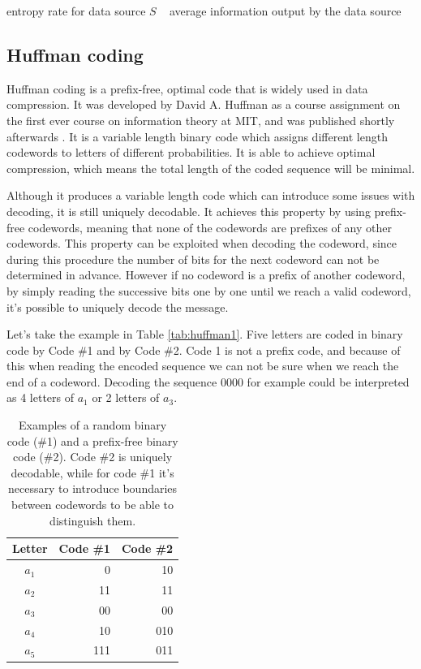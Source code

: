 entropy rate for data source $S$ ~ average information output by the data source

\subsection{Huffman coding}
Huffman coding is a prefix-free, optimal code that is widely used in data compression. It was developed by David A. Huffman as a course assignment on the first ever course on information theory at MIT, and was published shortly afterwards \cite{huffman_method_1952}. It is a variable length binary code which assigns different length codewords to letters of different probabilities. It is able to achieve optimal compression, which means the total length of the coded sequence will be minimal.

Although it produces a variable length code which can introduce some issues with decoding, it is still uniquely decodable. It achieves this property by using prefix-free codewords, meaning that none of the codewords are prefixes of any other codewords. This property can be exploited when decoding the codeword, since during this procedure the number of bits for the next codeword can not be determined in advance. However if no codeword is a prefix of another codeword, by simply reading the successive bits one by one until we reach a valid codeword, it's possible to uniquely decode the message.

Let's take the example in Table \ref{tab:huffman1}. Five letters are coded in binary code by Code \#1 and by Code \#2. Code 1 is not a prefix code, and because of this when reading the encoded sequence we can not be sure when we reach the end of a codeword. Decoding the sequence 0000 for example could be interpreted as 4 letters of $a_1$ or 2 letters of $a_3$.

\begin{table}
\caption{Examples of a random binary code (\#1) and a prefix-free binary code (\#2). Code \#2 is uniquely decodable, while for code \#1 it's necessary to introduce boundaries between codewords to be able to distinguish them.}
\centering
\begin{tabular}{crr}
\toprule
Letter & Code \#1 & Code \#2 \\
\midrule
$a_1$ & 0	& 10 \\
$a_2$ & 11	& 11 \\
$a_3$ & 00	& 00 \\
$a_4$ & 10 	& 010 \\
$a_5$ & 111	& 011 \\
\bottomrule
\end{tabular}
\label{tab:prefix}
\end{table}

